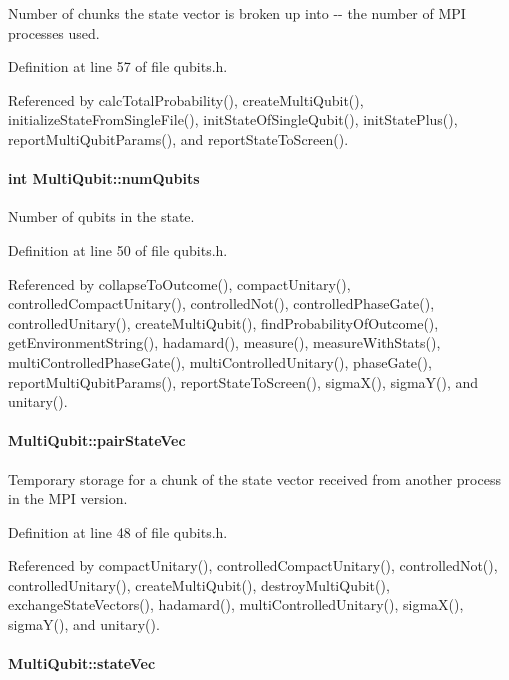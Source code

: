 Number of chunks the state vector is broken up into -\/-\/ the number of MPI processes used. 

Definition at line 57 of file qubits.h.

Referenced by calcTotalProbability(), createMultiQubit(), initializeStateFromSingleFile(), initStateOfSingleQubit(), initStatePlus(), reportMultiQubitParams(), and reportStateToScreen().\hypertarget{structMultiQubit_ab5b9795bdc6fb5855e1974dcbbaeb36f}{
\paragraph[{numQubits}]{\setlength{\rightskip}{0pt plus 5cm}int {\bf MultiQubit::numQubits}}\hfill}
\label{structMultiQubit_ab5b9795bdc6fb5855e1974dcbbaeb36f}


Number of qubits in the state. 

Definition at line 50 of file qubits.h.

Referenced by collapseToOutcome(), compactUnitary(), controlledCompactUnitary(), controlledNot(), controlledPhaseGate(), controlledUnitary(), createMultiQubit(), findProbabilityOfOutcome(), getEnvironmentString(), hadamard(), measure(), measureWithStats(), multiControlledPhaseGate(), multiControlledUnitary(), phaseGate(), reportMultiQubitParams(), reportStateToScreen(), sigmaX(), sigmaY(), and unitary().\hypertarget{structMultiQubit_a76f7db4eab52d2b30f58f973ada809c5}{
\paragraph[{pairStateVec}]{ {\bf MultiQubit::pairStateVec}}\hfill}
\label{structMultiQubit_a76f7db4eab52d2b30f58f973ada809c5}


Temporary storage for a chunk of the state vector received from another process in the MPI version. 

Definition at line 48 of file qubits.h.

Referenced by compactUnitary(), controlledCompactUnitary(), controlledNot(), controlledUnitary(), createMultiQubit(), destroyMultiQubit(), exchangeStateVectors(), hadamard(), multiControlledUnitary(), sigmaX(), sigmaY(), and unitary().\hypertarget{structMultiQubit_a45483190d6b01ef6b2f98f2bec9ab94f}{
\paragraph[{stateVec}]{ {\bf MultiQubit::stateVec}}\hfill}
\label{structMultiQubit_a45483190d6b01ef6b2f98f2bec9ab94f}


